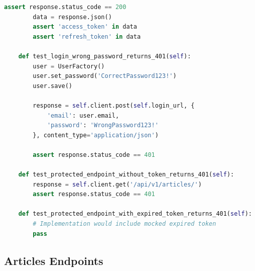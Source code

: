 \documentclass{report}
\begin{document}
\begin{lstlisting}[language=Python, caption=Authentication API integration tests]
        assert response.status_code == 200
        data = response.json()
        assert 'access_token' in data
        assert 'refresh_token' in data

    def test_login_wrong_password_returns_401(self):
        user = UserFactory()
        user.set_password('CorrectPassword123!')
        user.save()
        
        response = self.client.post(self.login_url, {
            'email': user.email,
            'password': 'WrongPassword123!'
        }, content_type='application/json')
        
        assert response.status_code == 401

    def test_protected_endpoint_without_token_returns_401(self):
        response = self.client.get('/api/v1/articles/')
        assert response.status_code == 401

    def test_protected_endpoint_with_expired_token_returns_401(self):
        # Implementation would include mocked expired token
        pass
\end{lstlisting}

\subsection{Articles Endpoints}
\end{document}
